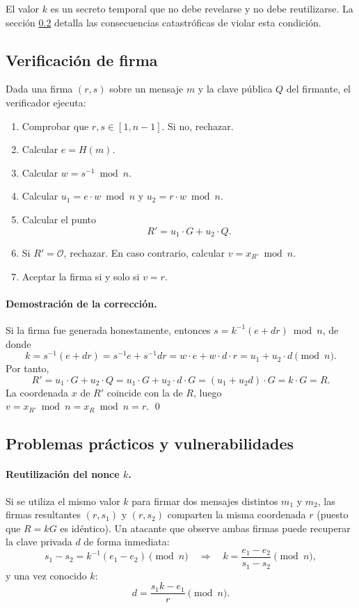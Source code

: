 El valor $k$ es un secreto temporal que no debe revelarse y no debe reutilizarse. La sección \ref{subsec:ecdsa-problemas} detalla las consecuencias catastróficas de violar esta condición.


\subsection{Verificación de firma}
\label{subsec:ecdsa-verificacion}

Dada una firma $(r, s)$ sobre un mensaje $m$ y la clave pública $Q$ del firmante, el verificador ejecuta:

\begin{enumerate}
    \item Comprobar que $r, s \in [1, n-1]$. Si no, rechazar.
    \item Calcular $e = H(m)$.
    \item Calcular $w = s^{-1} \bmod n$.
    \item Calcular $u_1 = e \cdot w \bmod n$ y $u_2 = r \cdot w \bmod n$.
    \item Calcular el punto
    \[
        R' = u_1 \cdot G + u_2 \cdot Q.
    \]
    \item Si $R' = \mathcal{O}$, rechazar. En caso contrario, calcular $v = x_{R'} \bmod n$.
    \item Aceptar la firma si y solo si $v = r$.
\end{enumerate}

\paragraph{Demostración de la corrección.}
Si la firma fue generada honestamente, entonces $s = k^{-1}(e + dr) \bmod n$, de donde
\[
    k = s^{-1}(e + dr) = s^{-1} e + s^{-1} d r = w \cdot e + w \cdot d \cdot r = u_1 + u_2 \cdot d \pmod{n}.
\]
Por tanto,
\[
    R' = u_1 \cdot G + u_2 \cdot Q = u_1 \cdot G + u_2 \cdot d \cdot G = (u_1 + u_2 d) \cdot G = k \cdot G = R.
\]
La coordenada $x$ de $R'$ coincide con la de $R$, luego $v = x_{R'} \bmod n = x_R \bmod n = r$. \qed


\subsection{Problemas prácticos y vulnerabilidades}
\label{subsec:ecdsa-problemas}

\paragraph{\texorpdfstring{Reutilización del nonce $k$.}{Reutilizacion del nonce k.}}
Si se utiliza el mismo valor $k$ para firmar dos mensajes distintos $m_1$ y $m_2$, las firmas resultantes $(r, s_1)$ y $(r, s_2)$ comparten la misma coordenada $r$ (puesto que $R = kG$ es idéntico). Un atacante que observe ambas firmas puede recuperar la clave privada $d$ de forma inmediata:
\[
    s_1 - s_2 = k^{-1}(e_1 - e_2) \pmod{n}
    \quad\Longrightarrow\quad
    k = \frac{e_1 - e_2}{s_1 - s_2} \pmod{n},
\]
y una vez conocido $k$:
\[
    d = \frac{s_1 k - e_1}{r} \pmod{n}.
\]

